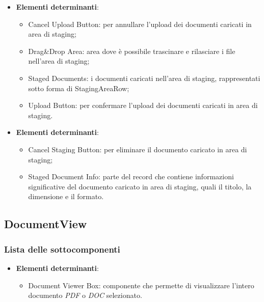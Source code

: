 \documentclass[10pt, a4paper]{article}
\begin{document}
\label{StagingAreaDettaglio}
\begin{itemize}
    \item \textbf{Elementi determinanti}:
     \begin{itemize}
        \item Cancel Upload Button: per annullare l'upload dei documenti caricati in area di staging;
        \item Drag\&Drop Area: area dove è possibile trascinare e rilasciare i file nell'area di staging;
        \item Staged Documents: i documenti caricati nell'area di staging, rappresentati sotto forma di StagingAreaRow;
        \item Upload Button: per confermare l'upload dei documenti caricati in area di staging.
    \end{itemize}
\end{itemize}

\label{StagingAreaRowDettaglio}
\begin{itemize}
    \item \textbf{Elementi determinanti}:
     \begin{itemize}
        \item Cancel Staging Button: per eliminare il documento caricato in area di staging;
        \item Staged Document Info: parte del record che contiene informazioni significative del documento caricato in area di staging, quali il titolo, la dimensione e il formato.
    \end{itemize}
\end{itemize}


\subsection{DocumentView}
\subsubsection{Lista delle sottocomponenti}

\label{DocumentViewerDettaglio}
\begin{itemize}
    \item \textbf{Elementi determinanti}:
     \begin{itemize}
        \item Document Viewer Box: componente che permette di visualizzare l'intero documento \textit{PDF} o \textit{DOC} selezionato.
    \end{itemize}
\end{itemize}
\end{document}
